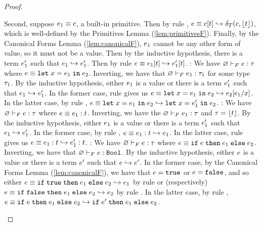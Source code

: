 \begin{proof}
\begin{itemize}
  Second, suppose $e_1 \equiv c$, a built-in primitive.
  Then by rule \eTPrim, 
  $e \equiv  c[t] \hookrightarrow \delta_T(c,\lfloor{\ensuremath{t}}\rfloor)$,
  which is well-defined by the Primitives Lemma (\ref{lem:primitivesF}).
  Finally, by the Canonical Forms Lemma (\ref{lem:canonicalF}), 
  $e_1$ cannot be any other
  form of value, so it must not be a value. 
  Then by the inductive hypothesis,
  there is a term $e'_1$ such that $e_1 \hookrightarrow e'_1$. 
  Then by rule \eTApp
  $e \equiv e_1[t] \hookrightarrow e'_1[t]$.
  \pfcase{\fLet}: We have 
  ${\varnothing} \vdash_F {e} : {\tau}$ where
  $e \equiv {{\texttt{let}}}\;x{{\;=\;}}e_1\;{{\texttt{in}}}\;e_2$. Inverting,
  we have that ${\varnothing} \vdash_F {e_1} : {\tau_1}$
  for some type $\tau_1$. 
  By the inductive hypothesis, either $e_1$ is a value
  or there is a term $e'_1$ such that $e_1 \hookrightarrow e'_1$.
  In the former case, rule \eLetV gives us
  $e \equiv \eletin{x}{\sexpr_1}{\sexpr_2} \step \subst{\sexpr_2}{x}{\sexpr_1}$.
  In the latter case, by rule \eLet, 
  $e \equiv {{\texttt{let}}}\;x{{\;=\;}}e_1\;{{\texttt{in}}}\;e_2 \hookrightarrow {{\texttt{let}}}\;x{{\;=\;}}e'_1\;{{\texttt{in}}}\;e_2$.
  \pfcase{\fAnn}: We have 
  ${\varnothing} \vdash_F {e} : {\tau}$ where
  $e \equiv e_1 : t$. Inverting,
  we have the ${\varnothing} \vdash_F {e_1} : {\tau}$ and
  $\tau = \lfloor{\ensuremath{t}}\rfloor$. 
  By the inductive hypothesis, either $e_1$ is a value
  or there is a term $e'_1$ such that $e_1 \hookrightarrow e'_1$.
  In the former case, by rule \eAnnV, 
  $e \equiv e_1 : t \hookrightarrow e_1$.
  In the latter case, rule \eAnn gives us 
  $e \equiv e_1 : t \hookrightarrow e'_1 : t$.
   \pfcase{\fIf}: We have 
   ${\varnothing} \vdash_F {e} : {\tau}$ where
   $e \equiv {{\texttt{if}}}\;{e}\;{{\texttt{then}}}\;{e_1}\;{{\texttt{else}}}\;{e_2}$. Inverting,
   we have that ${\varnothing} \vdash_F {e} : {\texttt{Bool}}$.
   By the inductive hypothesis, either $e$ is a value
   or there is a term $e'$ such that $e \hookrightarrow e'$.
   In the former case, by the Canonical Forms Lemma (\ref{lem:canonicalF}),
   we have that $e = \mathtt{true}$ or $e = \mathtt{false}$, and so
   either 
   $e \equiv {{\texttt{if}}}\;{\mathtt{true}}\;{{\texttt{then}}}\;{e_1}\;{{\texttt{else}}}\;{e_2} \hookrightarrow e_1$
   by rule \eIfT or (respectively)
   $e \equiv {{\texttt{if}}}\;{\mathtt{false}}\;{{\texttt{then}}}\;{e_1}\;{{\texttt{else}}}\;{e_2} \hookrightarrow e_2$
   by rule \eIfF.
   In the latter case, by rule \eIf, 
   $e \equiv {{\texttt{if}}}\;{e}\;{{\texttt{then}}}\;{e_1}\;{{\texttt{else}}}\;{e_2} \hookrightarrow {{\texttt{if}}}\;{e'}\;{{\texttt{then}}}\;{e_1}\;{{\texttt{else}}}\;{e_2}$.
  \end{itemize}
  \end{proof}

